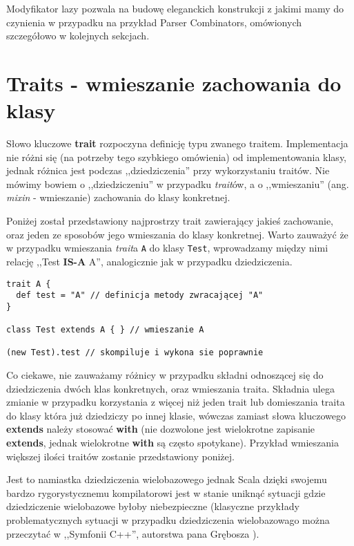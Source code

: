 Modyfikator lazy pozwala na budowę eleganckich konstrukcji z jakimi mamy do czynienia w przypadku na przykład Parser Combinators, omówionych szczegółowo w kolejnych sekcjach.


\section{Traits - wmieszanie zachowania do klasy}
\label{sec:traits}

Słowo kluczowe \textbf{trait} rozpoczyna definicję typu zwanego traitem.
Implementacja nie różni się (na potrzeby tego szybkiego omówienia) od implementowania klasy,
jednak różnica jest podczas ,,dziedziczenia'' przy wykorzystaniu traitów. Nie mówimy bowiem o ,,dziedziczeniu'' 
w przypadku \textit{trait}ów, a o ,,wmieszaniu'' (ang. \textit{mixin} - wmieszanie) zachowania do klasy konkretnej.

Poniżej został przedstawiony najprostrzy trait zawierający jakieś zachowanie, oraz jeden ze sposobów jego wmieszania do klasy konkretnej.
Warto zauważyć że w przypadku wmieszania \textit{trait}a \verb|A| do klasy \verb|Test|, wprowadzamy między nimi relację ,,Test \textbf{IS-A} A'',
analogicznie jak w przypadku dziedziczenia.

\begin{lstlisting}
trait A { 
  def test = "A" // definicja metody zwracającej "A"
}

class Test extends A { } // wmieszanie A

(new Test).test // skompiluje i wykona sie poprawnie
\end{lstlisting}

Co ciekawe, nie zauważamy różnicy w przypadku składni odnoszącej się do dziedziczenia dwóch klas konkretnych, oraz wmieszania traita.
Składnia ulega zmianie w przypadku korzystania z więcej niż jeden trait lub domieszania traita do klasy która już dziedziczy po innej klasie,
wówczas zamiast słowa kluczowego \textbf{extends} należy stosować \textbf{with} (nie dozwolone jest wielokrotne zapisanie \textbf{extends},
jednak wielokrotne \textbf{with} są często spotykane). Przykład wmieszania większej ilości traitów zostanie przedstawiony poniżej.

Jest to namiastka dziedziczenia wielobazowego jednak Scala dzięki swojemu bardzo rygorystycznemu kompilatorowi jest w stanie 
uniknąć sytuacji gdzie dziedziczenie wielobazowe byłoby niebezpieczne (klasyczne przykłady 
problematycznych sytuacji w przypadku dziedziczenia wielobazowago można przeczytać w ,,Symfonii C++'', autorstwa pana Grębosza \cite{symfonia}).

